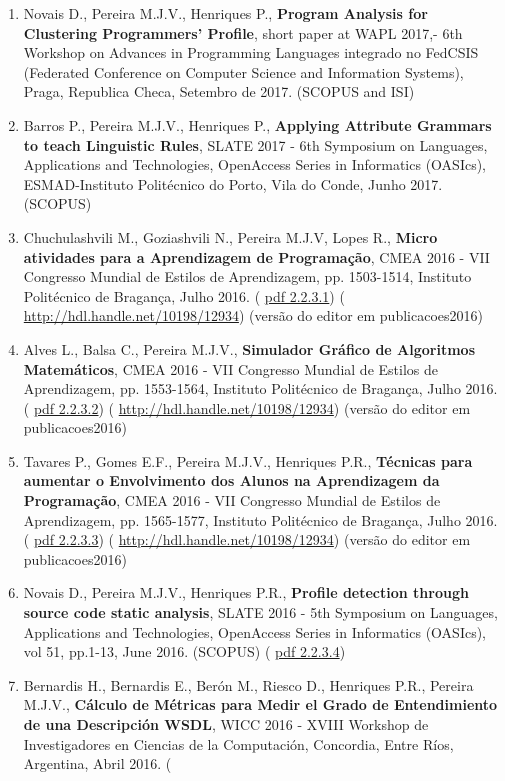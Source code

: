 \documentclass[11pt]{article}
\begin{document}
\begin{enumerate}
\item{Novais D., Pereira M.J.V., Henriques P., {
\bf{ Program Analysis for Clustering Programmers' Profile}}, short paper at WAPL 2017,- 6th Workshop on Advances in Programming Languages integrado no FedCSIS (Federated Conference on Computer Science and Information Systems), Praga, Republica Checa, Setembro de 2017. (SCOPUS and ISI)}
\item{Barros P., Pereira M.J.V., Henriques P., {
\bf{ Applying Attribute Grammars to teach Linguistic Rules}}, SLATE 2017 - 6th Symposium on Languages, Applications and Technologies, OpenAccess Series in Informatics (OASIcs), ESMAD-Instituto Politécnico do Porto, Vila do Conde, Junho 2017. (SCOPUS)}
\item{Chuchulashvili M., Goziashvili N., Pereira M.J.V, Lopes R., {
\bf{ Micro atividades para a Aprendizagem de Programação}}, CMEA 2016 - VII Congresso Mundial de Estilos de Aprendizagem, pp. 1503-1514, Instituto Politécnico de Bragança, Julho 2016. (
\href{run:Publicacoes/publicacoes/91.pdf}{pdf 2.2.3.1}) (
\url{http://hdl.handle.net/10198/12934}) (versão do editor em publicacoes2016)}
\item{Alves L., Balsa C., Pereira M.J.V., {
\bf{ Simulador Gráfico de Algoritmos Matemáticos}}, CMEA 2016 - VII Congresso Mundial de Estilos de Aprendizagem, pp. 1553-1564, Instituto Politécnico de Bragança, Julho 2016. (
\href{run:Publicacoes/publicacoes/90.pdf}{pdf 2.2.3.2}) (
\url{http://hdl.handle.net/10198/12934}) (versão do editor em publicacoes2016)}
\item{Tavares P., Gomes E.F., Pereira M.J.V., Henriques P.R., {
\bf{ Técnicas para aumentar o Envolvimento dos Alunos na Aprendizagem da Programação}}, CMEA 2016 - VII Congresso Mundial de Estilos de Aprendizagem, pp. 1565-1577, Instituto Politécnico de Bragança, Julho 2016. (
\href{run:Publicacoes/publicacoes/89.pdf}{pdf 2.2.3.3}) (
\url{http://hdl.handle.net/10198/12934}) (versão do editor em publicacoes2016)}
\item{Novais D., Pereira M.J.V., Henriques P.R., {
\bf{ Profile detection through source code static analysis}}, SLATE 2016 - 5th Symposium on Languages, Applications and Technologies, OpenAccess Series in Informatics (OASIcs), vol 51, pp.1-13, June 2016. (SCOPUS) (
\href{run:Publicacoes/publicacoes/88.pdf}{pdf 2.2.3.4})}
\item{Bernardis H., Bernardis E., Berón M., Riesco D., Henriques P.R., Pereira M.J.V.,{
\bf{ Cálculo de Métricas para Medir el Grado de Entendimiento de una Descripción WSDL}}, WICC 2016 - XVIII Workshop de Investigadores en Ciencias de la Computación, Concordia, Entre Ríos, Argentina, Abril 2016. (
}
\end{enumerate}
\end{document}
